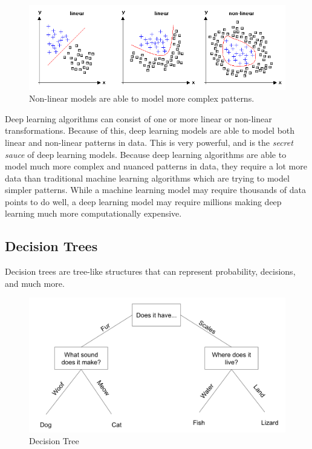 \documentclass{article}
\begin{document}
\begin{figure}[H]
    \centering
    \includegraphics[width=5.0in]{linearvsnonlinear.png}
    \caption{Non-linear models are able to model more complex patterns.}
    \label{fig:nonlinear}
\end{figure}

Deep learning algorithms can consist of one or more linear or non-linear transformations. Because of this, deep learning models are able to model both linear and non-linear patterns in data. This is very powerful, and is the \textit{secret sauce} of deep learning models. Because deep learning algorithms are able to model much more complex and nuanced patterns in data, they require a lot more data than traditional machine learning algorithms which are trying to model simpler patterns. While a machine learning model may require thousands of data points to do well, a deep learning model may require millions making deep learning much more computationally expensive.

\newpage
\subsection{Decision Trees} 
Decision trees are tree-like structures that can represent probability, decisions, and much more.

\begin{figure}[H]
    \centering
    \includegraphics[width=4.5in]{decisiontree.png}
    \caption{Decision Tree}
    \label{fig:tree}
\end{figure}
\end{document}
